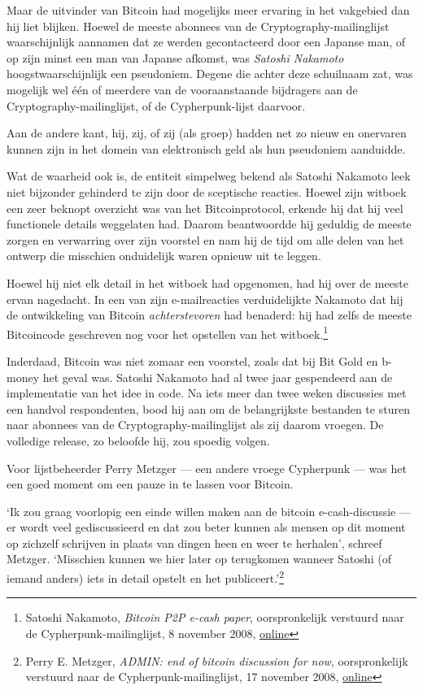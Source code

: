 \documentclass[
  a5paper,
  smalldemyvopaper,11pt,twoside,onecolumn,openright,extrafontsizes,
hidelinks]{memoir}
\begin{document}
Maar de uitvinder van Bitcoin had mogelijks meer ervaring in het
vakgebied dan hij liet blijken. Hoewel de meeste abonnees van de
Cryptography-mailinglijst waarschijnlijk aannamen dat ze werden
gecontacteerd door een Japanse man, of op zijn minst een man van Japanse
afkomst, was \emph{Satoshi Nakamoto} hoogstwaarschijnlijk een
pseudoniem. Degene die achter deze schuilnaam zat, was mogelijk wel één
of meerdere van de vooraanstaande bijdragers aan de
Cryptography-mailinglijst, of de Cypherpunk-lijst daarvoor.

Aan de andere kant, hij, zij, of zij (als groep) hadden net zo nieuw en
onervaren kunnen zijn in het domein van elektronisch geld als hun
pseudoniem aanduidde.

Wat de waarheid ook is, de entiteit simpelweg bekend als Satoshi
Nakamoto leek niet bijzonder gehinderd te zijn door de sceptische
reacties. Hoewel zijn witboek een zeer beknopt overzicht was van het
Bitcoinprotocol, erkende hij dat hij veel functionele details weggelaten
had. Daarom beantwoordde hij geduldig de meeste zorgen en verwarring
over zijn voorstel en nam hij de tijd om alle delen van het ontwerp die
misschien onduidelijk waren opnieuw uit te leggen.

Hoewel hij niet elk detail in het witboek had opgenomen, had hij over de
meeste ervan nagedacht. In een van zijn e-mailreacties verduidelijkte
Nakamoto dat hij de ontwikkeling van Bitcoin \emph{achterstevoren} had
benaderd: hij had zelfs de meeste Bitcoincode geschreven nog voor het
opstellen van het witboek.\footnote{Satoshi Nakamoto, \emph{Bitcoin P2P
  e-cash paper}, oorspronkelijk verstuurd naar de
  Cypherpunk-mailinglijst, 8 november 2008,
  \href{https://www.metzdowd.com/pipermail/cryptography/2008-November/014832.html}{online}}

Inderdaad, Bitcoin was niet zomaar een voorstel, zoals dat bij Bit Gold
en b-money het geval was. Satoshi Nakamoto had al twee jaar gespendeerd
aan de implementatie van het idee in code. Na iets meer dan twee weken
discussies met een handvol respondenten, bood hij aan om de
belangrijkste bestanden te sturen naar abonnees van de
Cryptography-mailinglijst als zij daarom vroegen. De volledige release,
zo beloofde hij, zou spoedig volgen.

Voor lijstbeheerder Perry Metzger --- een andere vroege Cypherpunk ---
was het een goed moment om een pauze in te lassen voor Bitcoin.

`Ik zou graag voorlopig een einde willen maken aan de bitcoin
e-cash-discussie --- er wordt veel gediscussieerd en dat zou beter
kunnen als mensen op dit moment op zichzelf schrijven in plaats van
dingen heen en weer te herhalen', schreef Metzger. `Misschien kunnen we
hier later op terugkomen wanneer Satoshi (of iemand anders) iets in
detail opstelt en het publiceert.'\footnote{Perry E. Metzger,
  \emph{ADMIN: end of bitcoin discussion for now}, oorspronkelijk
  verstuurd naar de Cypherpunk-mailinglijst, 17 november 2008,
  \href{https://www.metzdowd.com/pipermail/cryptography/2008-November/014867.html}{online}}
\end{document}

